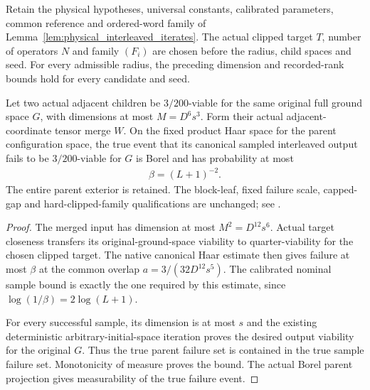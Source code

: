 \begin{lemma}
    \label{lem:physical_canonical_interleaved_parent_true_failure}
    \leanok
    Retain the physical hypotheses, universal constants, calibrated
    parameters, common reference and ordered-word family of
    Lemma~\ref{lem:physical_interleaved_iterates}. The actual clipped
    target $T$, number of operators $N$ and family $(F_i)$ are chosen
    before the radius, child spaces and seed. For every admissible radius,
    the preceding dimension and recorded-rank bounds hold for every
    candidate and seed.

    Let two actual adjacent children be $3/200$-viable for the same
    original full ground space $G$, with dimensions at most $M=D^6s^3$.
    Form their actual adjacent-coordinate tensor merge $W$. On the fixed
    product Haar space for the parent configuration space, the true event
    that its canonical sampled interleaved output fails to be
    $3/200$-viable for $G$ is Borel and has probability at most
    \begin{align}
        \beta=(L+1)^{-2}.
    \end{align}
    The entire parent exterior is retained. The block-leaf, fixed failure
    scale, capped-gap and hard-clipped-family qualifications are unchanged;
    see \cite{gap:alvv16_approximation_parameters}.
\end{lemma}
\begin{proof}\leanok
    The merged input has dimension at most $M^2=D^{12}s^6$. Actual target
    closeness transfers its original-ground-space viability to
    quarter-viability for the chosen clipped target. The native canonical
    Haar estimate then gives failure at most $\beta$ at the common overlap
    $a=3/(32D^{12}s^5)$. The calibrated nominal sample bound is exactly
    the one required by this estimate, since
    $\log(1/\beta)=2\log(L+1)$.

    For every successful sample, its dimension is at most $s$ and the
    existing deterministic arbitrary-initial-space iteration proves the
    desired output viability for the original $G$. Thus the true parent
    failure set is contained in the true sample failure set. Monotonicity
    of measure proves the bound. The actual Borel parent projection gives
    measurability of the true failure event.
\end{proof}

